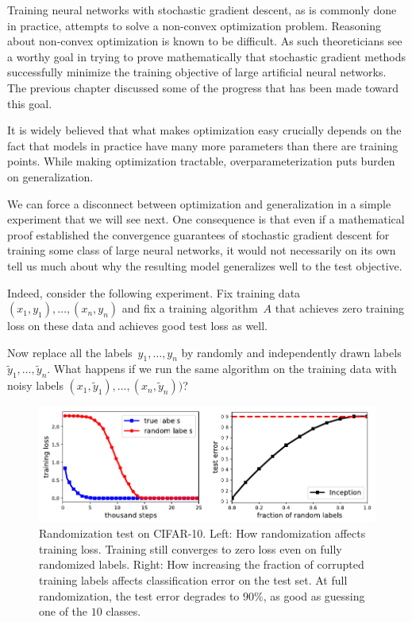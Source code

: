 \documentclass{tufte-book}
\begin{document}
Training neural networks with stochastic gradient descent, as is
commonly done in practice, attempts to solve a non-convex optimization
problem. Reasoning about non-convex optimization is known to be
difficult. As such theoreticians see a worthy goal in trying to prove
mathematically that stochastic gradient methods successfully minimize
the training objective of large artificial neural networks. The previous
chapter discussed some of the progress that has been made toward this
goal.

It is widely believed that what makes optimization easy crucially
depends on the fact that models in practice have many more parameters
than there are training points. While making optimization tractable,
overparameterization puts burden on generalization.

We can force a disconnect between optimization and generalization in a
simple experiment that we will see next. One consequence is that even if
a mathematical proof established the convergence guarantees of
stochastic gradient descent for training some class of large neural
networks, it would not necessarily on its own tell us much about why the
resulting model generalizes well to the test objective.

Indeed, consider the following experiment. Fix training data
\((x_1,y_1),\dots, (x_n, y_n)\) and fix a training algorithm~\(A\) that
achieves zero training loss on these data and achieves good test loss as
well.

Now replace all the labels~\(y_1,\dots,y_n\) by randomly and
independently drawn labels~\(\tilde y_1,\dots, \tilde y_n\). What
happens if we run the same algorithm on the training data with noisy
labels \((x_1,\tilde y_1),\dots, (x_n, \tilde y_n))\)?

\begin{figure}
\centering
\includegraphics[width=1\textwidth,height=\textheight]{assets/randomization-test}
\caption{Randomization test on CIFAR-10. Left: How randomization affects
training loss. Training still converges to zero loss even on fully
randomized labels. Right: How increasing the fraction of corrupted
training labels affects classification error on the test set. At full
randomization, the test error degrades to \(90\%\), as good as guessing
one of the \(10\) classes.}
\end{figure}
\end{document}
